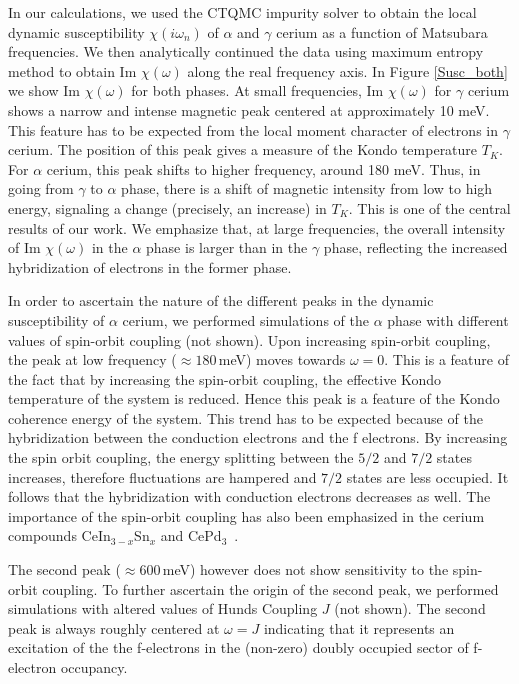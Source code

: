 \documentclass[10pt]{ruthesis}
\begin{document}
{In our calculations, we used the CTQMC impurity solver to obtain the
local dynamic  susceptibility $\chi(i\omega_n)$ of $\alpha$ and
$\gamma$ cerium as a function of Matsubara frequencies.  We then
analytically continued the data using maximum entropy method to obtain
Im $\chi (\omega)$ along the real frequency axis.  In Figure
\ref{Susc_both} we show Im $\chi(\omega)$ for both phases.  At small
frequencies, Im $\chi (\omega)$ for $\gamma$ cerium shows a narrow and
intense magnetic peak centered at approximately 10 meV. This feature
has to be expected from the local moment character of electrons in
$\gamma$ cerium.  The position of this peak gives a measure of the
Kondo temperature $T_K$.  For $\alpha$ cerium, this peak shifts to
higher frequency, around 180 meV.  Thus, in going from
$\gamma$ to $\alpha$ phase, there is a shift of magnetic intensity
from low to high energy, signaling a change (precisely, an increase)
in $T_K$.  This is one of the central results of our work.  We
emphasize that, at large frequencies, the overall intensity of Im
$\chi (\omega)$ in the $\alpha$ phase is larger than in the $\gamma$
phase, reflecting the increased hybridization of electrons in the
former phase.


In order to ascertain the nature of the different peaks in the dynamic
susceptibility of $\alpha$ cerium, we performed simulations of the
$\alpha$ phase with different values of spin-orbit coupling (not
shown).  Upon increasing spin-orbit coupling, the peak at low frequency
($\approx 180\,$meV) moves towards $\omega=0$.  This is a feature of
the fact that by increasing the spin-orbit coupling, the effective
Kondo temperature of the system is reduced.  Hence this peak is a
feature of the Kondo coherence energy of the system.  This trend has to
be expected because of the hybridization between the conduction
electrons and the f electrons. By increasing the spin orbit coupling,
the energy splitting between the $5/2$ and $7/2$ states increases,
therefore fluctuations are hampered and $7/2$ states are less
occupied. It follows that the hybridization with conduction electrons
decreases as well.  The importance of the spin-orbit coupling has also
been emphasized in the cerium compounds CeIn$_{3-x}$Sn$_x$ and
CePd$_3$~\cite{muraniSO, muraniCePd3, cox1987}.

The second peak ($\approx 600\,$meV) however does not show sensitivity
to the spin-orbit coupling.  To further ascertain the origin of the
second peak, we performed simulations with altered values of Hunds
Coupling $J$ (not shown).  The second peak is always roughly centered
at $\omega=J$ indicating that it represents an excitation of the the
f-electrons in the (non-zero) doubly occupied sector of f-electron
occupancy.

}
\end{document}
